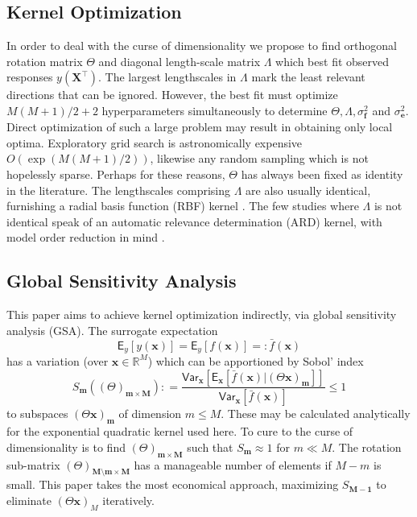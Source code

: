 \documentclass[preprint,12pt]{elsarticle}
\newcommand*{\M}[1]{\ensuremath{#1}\xspace}
\newcommand*{\vr}[1]{\M{\mathbf{#1}}}
\newcommand*{\st}[1]{\M{\mathbb{#1}}}
\newcommand*{\deq}{\M{\mathrel{\mathop:}=}}
\newcommand*{\deqr}{\M{=\mathrel{\mathop:}}}
\newcommand*{\ev}[2][]{\mathsf{E}_{#1}\!\left\lbrack{} #2 \right\rbrack}
\newcommand*{\var}[2][]{\mathsf{Var}_{#1}\!\left\lbrack{} #2 \right\rbrack}
\begin{document}
        \subsection{Kernel Optimization}
            In order to deal with the curse of dimensionality we propose to find orthogonal rotation matrix $\Theta$ and diagonal length-scale matrix $\Lambda$ which best fit observed responses $y(\vr{X}^{\intercal})$. The largest lengthscales in $\Lambda$ mark the least relevant directions that can be ignored. However, the best fit must optimize $M(M+1)/2+2$ hyperparameters simultaneously to determine $\Theta, \Lambda, \sigma^{2}_\vr{f}$ and $\sigma^{2}_\vr{e}$. Direct optimization of such a large problem may result in obtaining only local optima. Exploratory grid search is astronomically expensive $O(\exp(M(M+1)/2))$, likewise any random sampling which is not hopelessly sparse. Perhaps for these reasons, $\Theta$ has always been fixed as identity in the literature. The lengthscales comprising $\Lambda$ are also usually identical, furnishing a radial basis function (RBF) kernel \cite{Sacks.etal1989}. The few studies where $\Lambda$ is not identical speak of an automatic relevance determination (ARD) kernel, with model order reduction in mind \cite{Wipf.Nagarajan2007, Neal1996}.

        \subsection{Global Sensitivity Analysis}
            This paper aims to achieve kernel optimization indirectly, via global sensitivity analysis (GSA).
            The surrogate expectation
            \begin{equation*}
                \ev[y]{y(\vr{x})} = \ev[y]{f(\vr{x})} \deqr \bar{f}(\vr{x})
            \end{equation*}
            has a variation (over $\vr{x} \in \st{R}^{M}$) which can be apportioned by Sobol' index
            \begin{equation*}
                S_{\vr{m}}((\Theta)_{\vr{m}\times\vr{M}}) \deq \frac{\var[\vr{x}]{\ev[\vr{x}]{\bar{f}(\vr{x}) \vert (\Theta \vr{x})_{\vr{m}}}}}{\var[\vr{x}]{\bar{f}(\vr{x})}} \leq 1
            \end{equation*}
            to subspaces $(\Theta \vr{x})_{\vr{m}}$ of dimension $m\leq M$. These may be calculated analytically for the exponential quadratic kernel used here. To cure to the curse of dimensionality is to find $(\Theta)_{\vr{m}\times\vr{M}}$ such that $S_{\vr{m}} \approx 1$ for $m\ll M$. The rotation sub-matrix $(\Theta)_{\vr{M}\setminus\vr{m}\times\vr{M}}$ has a manageable number of elements if $M-m$ is small. This paper takes the most economical approach, maximizing $S_{\vr{M-1}}$ to eliminate $(\Theta \vr{x})_M$ iteratively.
\end{document}

